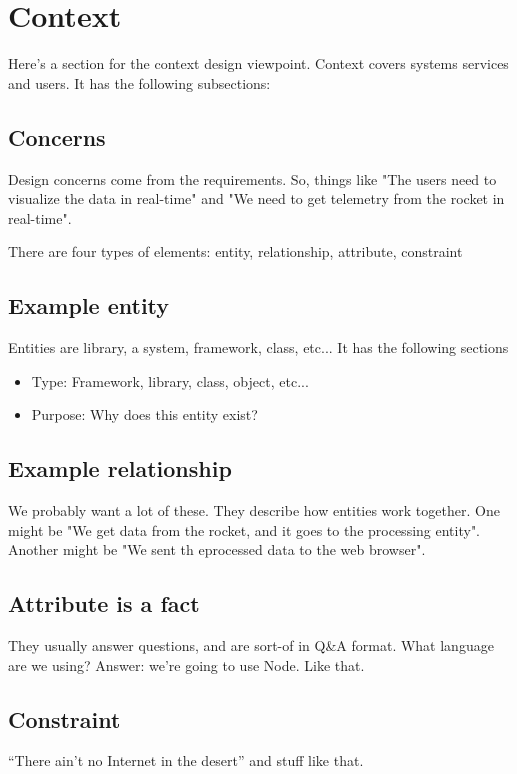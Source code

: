 \documentclass[10pt,draftclsnofoot,onecolumn]{IEEEtran}
\begin{document}
	
	
	\section{Context}

	Here's a section for the context design viewpoint.
	Context covers systems services and users.
	It has the following subsections:

	\subsection{Concerns}
	Design concerns come from the requirements. So, things like "The users need to visualize the data in real-time"
	and "We need to get telemetry from the rocket in real-time".

	There are four types of elements: entity, relationship, attribute, constraint

	\subsection{Example entity}
	Entities are library, a system, framework, class, etc... It has the following sections
	\begin{itemize}
		\item Type: Framework, library, class, object, etc...
		\item Purpose: Why does this entity exist?
	\end{itemize}



	\subsection{Example relationship}
	We probably want a lot of these.
	They describe how entities work together.
	One might be "We get data from the rocket, and it goes to the processing entity".
	Another might be "We sent th eprocessed data to the web browser".


	\subsection{Attribute is a fact}
	They usually answer questions, and are sort-of in Q\&A format.
	What language are we using? Answer: we're going to use Node. Like that.

	\subsection {Constraint}
	``There ain't no Internet in the desert'' and stuff like that.
\end{document}
